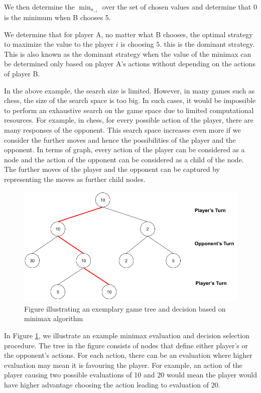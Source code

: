  We then determine the $\min_{a_{-i}}$ over the set of chosen values and determine that $0$ is the minimum when B chooses 5.

 We determine that for player A, no matter what B chooses, the optimal strategy to maximize the value to the player $i$ is choosing $5$. this is the dominant strategy. This is also known as the dominant strategy when the value of the minimax can be determined only based on player A's actions without depending on the actions of player B. 

 In the above example, the search size is limited. However, in many games such as chess, the size of the search space is too big. In such cases, it would be impossible to perform an exhaustive search on the game space due to limited computational resources. For example, in chess, for every possible action of the player, there are many responses of the opponent. This search space increases even more if we consider the further moves and hence the possibilities of the player and the opponent. In terms of graph, every action of the player can be considered as a node and the action of the opponent can be considered as a child of the node. The further moves of the player and the opponent can be captured by representing the moves as further child nodes.

\begin{figure}
    \centering
    \includegraphics[width=\linewidth]{../img/Minimax1.png}
    \caption{Figure illustrating an exemplary game tree and decision based on minimax algorithm}
    \label{fig:minimax1}
\end{figure}

In Figure \ref{fig:minimax1}, we illustrate an example minimax evaluation and decision selection procedure. The tree in the figure consists of nodes that define either player's or the opponent's actions. For each action, there can be an evaluation where higher evaluation may mean it is favouring the player. For example, an action of the player causing two possible evaluations of 10 and 20 would mean the player would have higher advantage choosing the action leading to evaluation of 20. 

